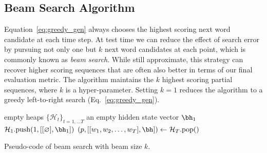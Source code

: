 \subsection{Beam Search Algorithm}
\label{sup-material:beam_search}
Equation~\ref{eq:greedy_gen} always chooses the highest scoring next word candidate
at each time step. At test time we can reduce the effect of search error 
by pursuing not only one but $k$ next word candidates at each point, which 
is commonly known as {\it beam search}.
While still approximate, this strategy can recover higher scoring sequences 
that are often also better in terms of our final evaluation metric.
The algorithm maintains the $k$ highest scoring partial
sequences, where $k$ is a hyper-parameter.
Setting $k=1$ reduces the algorithm to a greedy left-to-right search 
(Eq.~\eqref{eq:greedy_gen}). 
\begin{algorithm}[!h]
  empty heaps $\{\mathcal{H}_t\}_{t = 1, \dots T}$\;
  an empty hidden state vector $\bh_1$\;
  $\mathcal{H}_1.\mbox{push}(1, [[\varnothing], \bh_1])$\;
  $(p, [[w_1, w_2, \dots, w_T], \bh]) \leftarrow \mathcal{H}_T.\mbox{pop}()$\;
  \KwOut{$[w_1, w_2, \dots, w_T]$}
 
 \caption{Pseudo-code of beam search with beam size $k$.}
  \label{alg:beam} 
\end{algorithm}


\newpage






